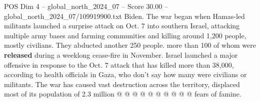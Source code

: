 \begin{textsample}{POS Dim 4 – global\_north\_2024\_07 – Score 30.00 – global\_north\_2024\_07/109919900.txt}
Biden.
The war began when Hamas-led militants launched a surprise attack on Oct. 7 into southern Israel, attacking multiple army bases and farming communities and killing around 1,200 people, mostly civilians.
They abducted another 250 people. more than 100 of whom were \textbf{released} during a weeklong cease-fire in November.
Israel launched a major offensive in response to the Oct. 7 attack that has killed more than 38,000, according to health officials in Gaza, who don't say how many were civilians or militants.
The war has caused vast destruction across the territory, displaced most of its population of 2.3 million @ @ @ @ @ @ @ @ @ @ fears of famine.

\end{textsample}
